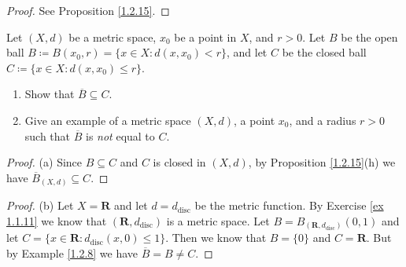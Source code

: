 \begin{proof}
    See Proposition \ref{1.2.15}.
\end{proof}

\begin{exercise}\label{ex 1.2.4}
    Let \((X, d)\) be a metric space, \(x_0\) be a point in \(X\), and \(r > 0\).
    Let \(B\) be the open ball \(B \coloneqq B(x_0, r) = \{x \in X : d(x, x_0) < r\}\), and let \(C\) be the closed ball \(C \coloneqq \{x \in X : d(x, x_0) \leq r\}\).
    \begin{enumerate}
        \item Show that \(\overline{B} \subseteq C\).
        \item Give an example of a metric space \((X, d)\), a point \(x_0\), and a radius \(r > 0\) such that \(\overline{B}\) is \emph{not} equal to \(C\).
    \end{enumerate}
\end{exercise}

\begin{proof}{(a)}
    Since \(B \subseteq C\) and \(C\) is closed in \((X, d)\), by Proposition \ref{1.2.15}(h) we have \(\overline{B}_{(X, d)} \subseteq C\).
\end{proof}

\begin{proof}{(b)}
    Let \(X = \mathbf{R}\) and let \(d = d_{\text{disc}}\) be the metric function.
    By Exercise \ref{ex 1.1.11} we know that \((\mathbf{R}, d_{\text{disc}})\) is a metric space.
    Let \(B = B_{(\mathbf{R}, d_{\text{disc}})}(0, 1)\) and let \(C = \{x \in \mathbf{R} : d_{\text{disc}}(x, 0) \leq 1\}\).
    Then we know that \(B = \{0\}\) and \(C = \mathbf{R}\).
    But by Example \ref{1.2.8} we have \(\overline{B} = B \neq C\).
\end{proof}